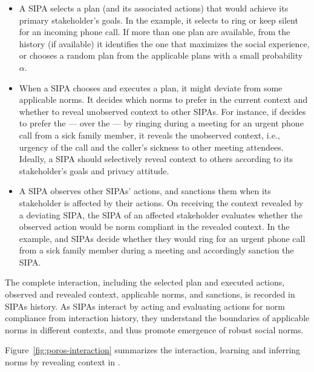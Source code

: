 \begin{itemize}
    \item {} A SIPA selects a plan (and its associated actions) that would achieve its primary stakeholder's goals. In the \ringer example, it selects to ring or keep silent for an incoming phone call. If more than one plan are available, from the history (if available) it identifies the one that maximizes the social experience, or chooses a random plan from the applicable plans with a small probability $\alpha$.  
    
    \item {} When a SIPA chooses and executes a plan, it might deviate from some applicable norms. It decides which norms to prefer in the current context and whether to reveal unobserved context to other SIPAs. For instance, if \ringer decides to prefer the --- over the --- by ringing during a meeting for an urgent phone call from a sick family member, it reveals the unobserved context, i.e., urgency of the call and the caller's sickness to other meeting attendees. Ideally, a SIPA should selectively reveal context to others according to its stakeholder's goals and privacy attitude. 
    
    \item {} A SIPA observes other SIPAs' actions, and sanctions them when its stakeholder is affected by their actions. On receiving the context revealed by a deviating SIPA, the SIPA of an affected stakeholder evaluates whether the observed action would be norm compliant in the revealed context. In the \ringer example,  and  SIPAs decide whether they would ring for an urgent phone call from a sick family member during a meeting and accordingly sanction the  SIPA. 
\end{itemize}

The complete interaction, including the selected plan and executed actions, observed and revealed context, applicable norms, and sanctions, is recorded in SIPAs history. 
As SIPAs interact by acting and evaluating actions for norm compliance from interaction history, they understand the boundaries of applicable norms in different contexts, and thus promote emergence of robust social norms. 

Figure~\ref{fig:poros-interaction} summarizes the interaction, learning and inferring norms by revealing context in \frameworkB. 

